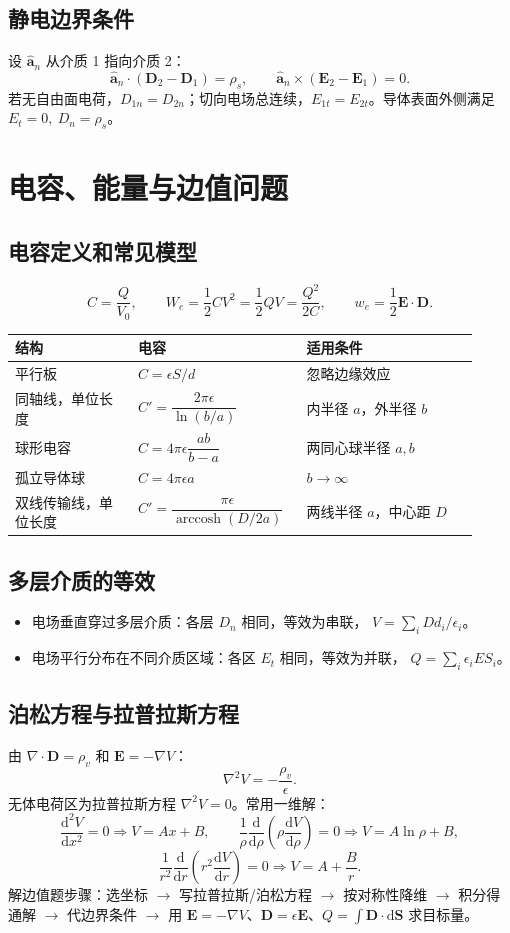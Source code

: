 \documentclass[11pt,a4paper]{ctexart}
\newcommand{\dd}{\mathrm{d}}
\newcommand{\uv}[1]{\hat{\bm a}_{#1}}
\newcommand{\E}{\bm E}
\newcommand{\D}{\bm D}
\newcommand{\divg}{\nabla\cdot}
\newcommand{\grad}{\nabla}
\begin{document}
\subsection{静电边界条件}
设 $\uv n$ 从介质 1 指向介质 2：
\[
\uv n\cdot(\D_2-\D_1)=\rho_s,\qquad
\uv n\times(\E_2-\E_1)=0.
\]
若无自由面电荷，$D_{1n}=D_{2n}$；切向电场总连续，$E_{1t}=E_{2t}$。导体表面外侧满足 $E_t=0,\ D_n=\rho_s$。

\section{电容、能量与边值问题}
\subsection{电容定义和常见模型}
\[
C=\frac{Q}{V_0},\qquad W_e=\frac12CV^2=\frac12QV=\frac{Q^2}{2C},\qquad
w_e=\frac12\E\cdot\D.
\]
\begin{longtable}{p{0.25\linewidth}p{0.32\linewidth}p{0.35\linewidth}}
\toprule
结构 & 电容 & 适用条件 \\
\midrule
平行板 & $C=\epsilon S/d$ & 忽略边缘效应 \\
同轴线，单位长度 & $C'=\dfrac{2\pi\epsilon}{\ln(b/a)}$ & 内半径 $a$，外半径 $b$ \\
球形电容 & $C=4\pi\epsilon\dfrac{ab}{b-a}$ & 两同心球半径 $a,b$ \\
孤立导体球 & $C=4\pi\epsilon a$ & $b\to\infty$ \\
双线传输线，单位长度 & $C'=\dfrac{\pi\epsilon}{\operatorname{arccosh}(D/2a)}$ & 两线半径 $a$，中心距 $D$ \\
\bottomrule
\end{longtable}

\subsection{多层介质的等效}
\begin{itemize}
\item 电场垂直穿过多层介质：各层 $D_n$ 相同，等效为串联，
$V=\sum_i D d_i/\epsilon_i$。
\item 电场平行分布在不同介质区域：各区 $E_t$ 相同，等效为并联，
$Q=\sum_i \epsilon_i E S_i$。
\end{itemize}

\subsection{泊松方程与拉普拉斯方程}
由 $\divg\D=\rho_v$ 和 $\E=-\grad V$：
\[
\nabla^2V=-\frac{\rho_v}{\epsilon}.
\]
无体电荷区为拉普拉斯方程 $\nabla^2V=0$。常用一维解：
\[
\frac{\dd^2V}{\dd x^2}=0\Rightarrow V=Ax+B,\qquad
\frac{1}{\rho}\frac{\dd}{\dd\rho}\left(\rho\frac{\dd V}{\dd\rho}\right)=0\Rightarrow V=A\ln\rho+B,
\]
\[
\frac{1}{r^2}\frac{\dd}{\dd r}\left(r^2\frac{\dd V}{\dd r}\right)=0\Rightarrow V=A+\frac{B}{r}.
\]
解边值题步骤：选坐标 $\to$ 写拉普拉斯/泊松方程 $\to$ 按对称性降维 $\to$ 积分得通解 $\to$ 代边界条件 $\to$ 用 $\E=-\grad V$、$\D=\epsilon\E$、$Q=\int\D\cdot\dd\bm S$ 求目标量。
\end{document}
